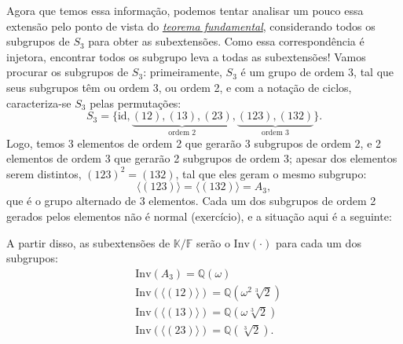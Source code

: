 \documentclass[../algebraIII_notes.tex]{subfiles}
\begin{document}
\begin{example}
	Agora que temos essa informação, podemos tentar analisar um pouco essa extensão pelo ponto de vista do \hyperlink{fundamental_galois}{\textit{teorema fundamental}}, considerando todos os subgrupos de \(S_{3}\) para obter as subextensões. Como essa correspondência é injetora, encontrar todos os subgrupo leva a todas as subextensões!
	Vamos procurar os subgrupos de \(S_{3}\): primeiramente, \(S_{3} \) é um grupo de ordem 3, tal que seus subgrupos têm ou ordem 3, ou ordem 2, e com a notação de ciclos, caracteriza-se \(S_{3}\) pelas permutações:
	\[
		S_{3} = \{\mathrm{id}, \underbrace{(12), (13), (23)}_{\text{ordem 2}}, \underbrace{(123), (132)}_{\text{ordem 3}}\}.
	\]
	Logo, temos 3 elementos de ordem 2 que gerarão 3 subgrupos de ordem 2, e 2 elementos de ordem 3 que gerarão 2 subgrupos de ordem 3; apesar dos elementos serem distintos, \((123)^{2}=(132)\), tal que eles geram o mesmo subgrupo:
	\[
		\langle (123) \rangle = \langle (132) \rangle = A_{3},
	\]
	que é o grupo alternado de 3 elementos. Cada um dos subgrupos de ordem 2 gerados pelos elementos não é normal (exercício), e a situação aqui é a seguinte:
	\begin{center}
	\end{center}
	A partir disso, as subextensões de \(\mathbb{K}/\mathbb{F}\) serão o \(\mathrm{Inv}(\cdot )\) para cada um dos subgrupos:
	\begin{align*}
		 & \mathrm{Inv}(A_3) = \mathbb{Q}(\omega )                                 \\
		 & \mathrm{Inv}(\langle (12) \rangle) = \mathbb{Q}(\omega^{2}\sqrt[3]{2} ) \\
		 & \mathrm{Inv}(\langle (13) \rangle) = \mathbb{Q}(\omega\sqrt[3]{2} )     \\
		 & \mathrm{Inv}(\langle (23) \rangle) = \mathbb{Q}(\sqrt[3]{2}).
	\end{align*}


\end{example}
\end{document}
